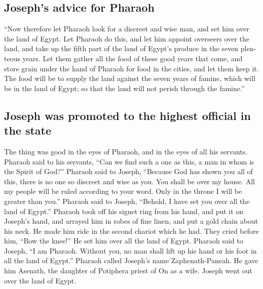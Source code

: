\begin{paracol}{2}
\begin{otherlanguage}{english}
\hypertarget{josephs-advice-for-pharaoh}{%
\subsection{Joseph's advice for
Pharaoh}\label{josephs-advice-for-pharaoh}}

 ``Now therefore let Pharaoh look for a discreet and wise
man, and set him over the land of Egypt.  Let Pharaoh do
this, and let him appoint overseers over the land, and take up the fifth
part of the land of Egypt's produce in the seven plenteous years.
 Let them gather all the food of these good years that
come, and store grain under the hand of Pharaoh for food in the cities,
and let them keep it.  The food will be to supply the
land against the seven years of famine, which will be in the land of
Egypt; so that the land will not perish through the famine.''

\hypertarget{joseph-was-promoted-to-the-highest-official-in-the-state}{%
\subsection{Joseph was promoted to the highest official in the
state}\label{joseph-was-promoted-to-the-highest-official-in-the-state}}

 The thing was good in the eyes of Pharaoh, and in the
eyes of all his servants.  Pharaoh said to his servants,
``Can we find such a one as this, a man in whom is the Spirit of God?''
 Pharaoh said to Joseph, ``Because God has shown you all
of this, there is no one so discreet and wise as you. 
You shall be over my house. All my people will be ruled according to
your word. Only in the throne I will be greater than you.''
 Pharaoh said to Joseph, ``Behold, I have set you over
all the land of Egypt.''  Pharaoh took off his signet
ring from his hand, and put it on Joseph's hand, and arrayed him in
robes of fine linen, and put a gold chain about his neck.
 He made him ride in the second chariot which he had.
They cried before him, ``Bow the knee!'' He set him over all the land of
Egypt.  Pharaoh said to Joseph, ``I am Pharaoh. Without
you, no man shall lift up his hand or his foot in all the land of
Egypt.''  Pharaoh called Joseph's name Zaphenath-Paneah.
He gave him Asenath, the daughter of Potiphera priest of On as a wife.
Joseph went out over the land of Egypt.


\end{otherlanguage}
\end{paracol}
